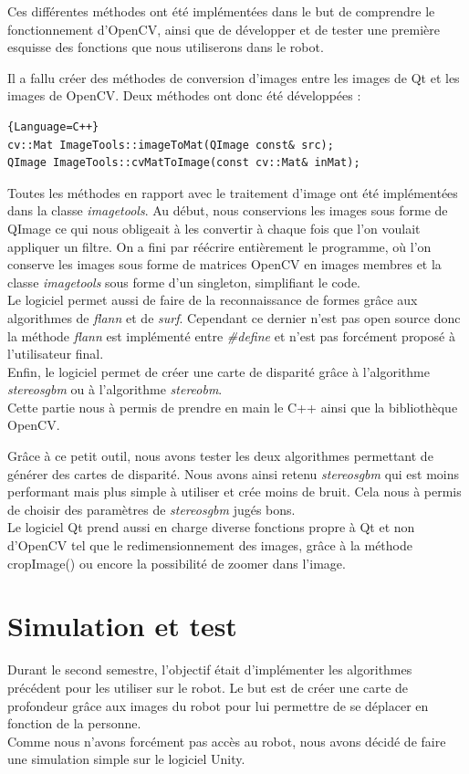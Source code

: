 \documentclass[12pt,a4paper]{report}
\begin{document}
Ces différentes méthodes ont été implémentées dans le but de comprendre le fonctionnement d'OpenCV, ainsi que de développer et de tester une première esquisse des fonctions que nous utiliserons dans le robot.

Il a fallu créer des méthodes de conversion d'images entre les images de Qt et les images de OpenCV. Deux méthodes ont donc été développées : 

\begin{lstlisting}{Language=C++}
cv::Mat ImageTools::imageToMat(QImage const& src);
QImage ImageTools::cvMatToImage(const cv::Mat& inMat);
\end{lstlisting}

Toutes les méthodes en rapport avec le traitement d'image ont été implémentées dans la classe \textit{imagetools}. Au début, nous conservions les images sous forme de QImage ce qui nous obligeait à les convertir à chaque fois que l'on voulait appliquer un filtre. On a fini par réécrire entièrement le programme, où l'on conserve les images sous forme de matrices OpenCV en images membres et la classe \textit{imagetools} sous forme d'un singleton, simplifiant le code.\\
Le logiciel permet aussi de faire de la reconnaissance de formes grâce aux algorithmes de \textit{flann} et de \textit{surf}. Cependant ce dernier n'est pas open source donc la méthode \textit{flann} est implémenté entre \textit{\#define} et n'est pas forcément proposé à l'utilisateur final.\\
Enfin, le logiciel permet de créer une carte de disparité grâce à l'algorithme \textit{stereosgbm} ou à l'algorithme \textit{stereobm}.\\

Cette partie nous à permis de prendre en main le C++ ainsi que la bibliothèque OpenCV. 

Grâce à ce petit outil, nous avons tester les deux algorithmes permettant de générer des cartes de disparité. Nous avons ainsi retenu \textit{stereosgbm} qui est moins performant mais plus simple à utiliser et crée moins de bruit. Cela nous à permis de choisir des paramètres de \textit{stereosgbm} jugés bons.\\

Le logiciel Qt prend aussi en charge diverse fonctions propre à Qt et non d'OpenCV tel que le redimensionnement des images, grâce à la méthode cropImage() ou encore la possibilité de zoomer dans l'image.

\section{Simulation et test}
Durant le second semestre, l'objectif était d'implémenter les algorithmes précédent pour les utiliser sur le robot. Le but est de créer une carte de profondeur grâce aux images du robot pour lui permettre de se déplacer en fonction de la personne.\\
Comme nous n'avons forcément pas accès au robot, nous avons décidé de faire une simulation simple sur le logiciel Unity.\\
\end{document}
